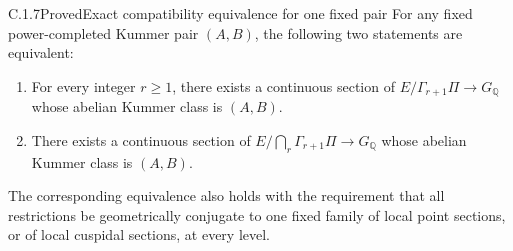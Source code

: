 \begin{result}{C.1.7}{Proved}{Exact compatibility equivalence for one fixed pair}
\label{thm:ghost-fixed-pair-compatible}
For any fixed power-completed Kummer pair \((A,B)\), the following
two statements are equivalent:
\begin{enumerate}
 \item For every integer \(r\geq1\), there exists a continuous
 section of \(E/\Gamma_{r+1}\Pi\to G_{\mathbb Q}\) whose
 abelian Kummer class is \((A,B)\).
 \item There exists a continuous section of
 \(E/\bigcap_r\Gamma_{r+1}\Pi\to G_{\mathbb Q}\) whose
 abelian Kummer class is \((A,B)\).
\end{enumerate}
The corresponding equivalence also holds with the requirement
that all restrictions be geometrically conjugate to one fixed
family of local point sections, or of local cuspidal sections,
at every level.
\end{result}
